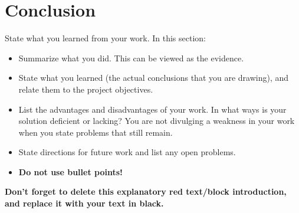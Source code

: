 \chapter{Conclusion} %

\begin{tcolorbox}[      %
    boxrule=0pt,        %
    colback=white,      %
    coltext=red         %
]                       %
    State what you learned from your work. In this section:
    \begin{itemize}
      \item Summarize what you did. This can be viewed as the evidence.
      \item State what you learned (the actual conclusions that you are drawing), and relate them to the project objectives.
      \item List the advantages and disadvantages of your work. In what ways is your solution deficient or lacking? You are not divulging a weakness in your work when you state problems that still remain.
      \item State directions for future work and list any open problems.
      \item \textbf{Do not use bullet points!}
    \end{itemize}
    
    \vspace{15pt}       %
    \begin{center}      %
    \textbf{Don't forget to delete this explanatory red text/block introduction, and replace it with your text in black.}
    \end{center}        %
\end{tcolorbox}         %
